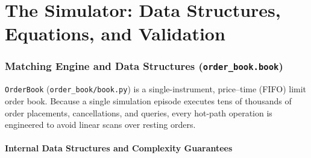 \documentclass[11pt,a4paper]{article}
\newcommand{\code}[1]{\texttt{#1}}
\begin{document}
\part{The Simulator: Data Structures, Equations, and Validation}
\label{part:one}

\section{Matching Engine and Data Structures (\code{order\_book.book})}
\label{sec:book}

\code{OrderBook} (\code{order\_book/book.py}) is a single-instrument, price--time (FIFO) limit order
book. Because a single simulation episode executes tens of thousands of order placements, cancellations,
and queries, every hot-path operation is engineered to avoid linear scans over resting orders.

\subsection{Internal Data Structures and Complexity Guarantees}
\end{document}
